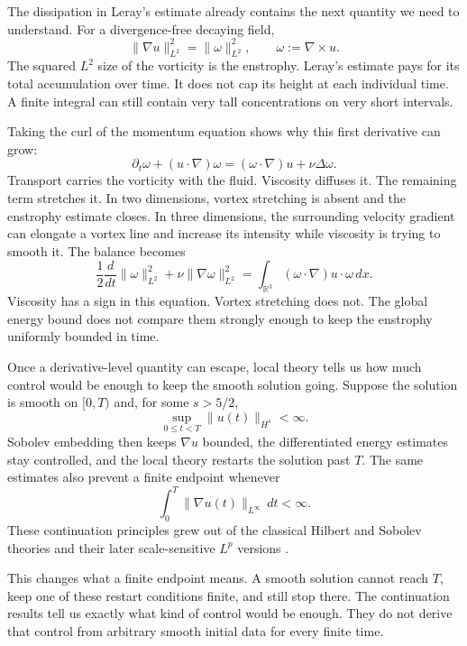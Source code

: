 The dissipation in Leray's estimate already contains the next quantity we need to understand.
For a divergence-free decaying field,
\[
  \lVert\nabla u\rVert_{L^2}^{2}
  =
  \lVert\omega\rVert_{L^2}^{2},
  \qquad
  \omega:=\nabla\times u.
\]
The squared \(L^2\) size of the vorticity is the enstrophy.
Leray's estimate pays for its total accumulation over time.
It does not cap its height at each individual time.
A finite integral can still contain very tall concentrations on very short intervals.

Taking the curl of the momentum equation shows why this first derivative can grow:
\begin{equation}\label{eq:HistoricalVorticityEquation}
  \partial_t\omega+(u\cdot\nabla)\omega
  =
  (\omega\cdot\nabla)u+\nu\Delta\omega.
\end{equation}
Transport carries the vorticity with the fluid.
Viscosity diffuses it.
The remaining term stretches it.
In two dimensions, vortex stretching is absent and the enstrophy estimate closes.
In three dimensions, the surrounding velocity gradient can elongate a vortex line and increase its intensity while viscosity is trying to smooth it.
The balance becomes
\[
  \frac12\frac{d}{dt}\lVert\omega\rVert_{L^2}^{2}
  +\nu\lVert\nabla\omega\rVert_{L^2}^{2}
  =
  \int_{\mathbb R^3}(\omega\cdot\nabla)u\cdot\omega\,dx.
\]
Viscosity has a sign in this equation.
Vortex stretching does not.
The global energy bound does not compare them strongly enough to keep the enstrophy uniformly bounded in time.


Once a derivative-level quantity can escape, local theory tells us how much control would be enough to keep the smooth solution going.
Suppose the solution is smooth on \([0,T)\) and, for some \(s>5/2\),
\begin{equation}\label{eq:HistoricalSobolevContinuation}
  \sup_{0\leq t<T}\lVert u(t)\rVert_{H^s}<\infty.
\end{equation}
Sobolev embedding then keeps \(\nabla u\) bounded, the differentiated energy estimates stay controlled, and the local theory restarts the solution past \(T\).
The same estimates also prevent a finite endpoint whenever
\[
  \int_0^T\lVert\nabla u(t)\rVert_{L^\infty}\,dt<\infty.
\]
These continuation principles grew out of the classical Hilbert and Sobolev theories and their later scale-sensitive \(L^p\) versions \parencite{FujitaKato1964,Kato1984}.

This changes what a finite endpoint means.
A smooth solution cannot reach \(T\), keep one of these restart conditions finite, and still stop there.
The continuation results tell us exactly what kind of control would be enough.
They do not derive that control from arbitrary smooth initial data for every finite time.


